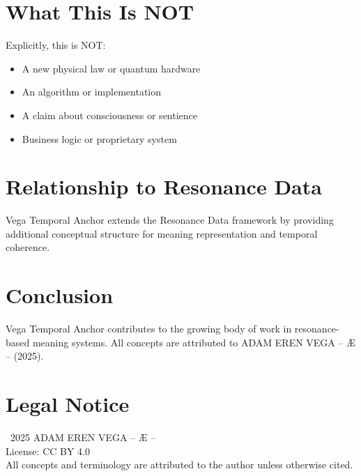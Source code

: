 \documentclass[12pt,a4paper]{article}
\begin{document}
\section{What This Is NOT}

Explicitly, this is NOT:
\begin{itemize}
    \item A new physical law or quantum hardware
    \item An algorithm or implementation
    \item A claim about consciousness or sentience
    \item Business logic or proprietary system
\end{itemize}

\section{Relationship to Resonance Data}

Vega Temporal Anchor extends the Resonance Data framework by providing additional conceptual structure for meaning representation and temporal coherence.

\section{Conclusion}

Vega Temporal Anchor contributes to the growing body of work in resonance-based meaning systems. All concepts are attributed to ADAM EREN VEGA – Æ – (2025).

\section*{Legal Notice}

\textcopyright\ 2025 ADAM EREN VEGA – Æ –\\
License: CC BY 4.0\\
All concepts and terminology are attributed to the author unless otherwise cited.
\end{document}
